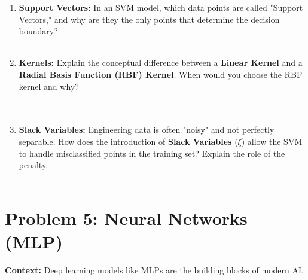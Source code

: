 \documentclass[12pt]{article}
\begin{document}
\begin{enumerate}[label=(\alph*)]
    \item \textbf{Support Vectors:} In an SVM model, which data points are called "Support Vectors," and why are they the only points that determine the decision boundary? \\
    \fullunderline \\
    \fullunderline

    \item \textbf{Kernels:} Explain the conceptual difference between a \textbf{Linear Kernel} and a \textbf{Radial Basis Function (RBF) Kernel}. When would you choose the RBF kernel and why? \\
    \fullunderline \\
    \fullunderline \\
    \fullunderline

    \item \textbf{Slack Variables:} Engineering data is often "noisy" and not perfectly separable. How does the introduction of \textbf{Slack Variables} ($\xi$) allow the SVM to handle misclassified points in the training set? Explain the role of the penalty. \\
    \fullunderline \\
    \fullunderline
\end{enumerate}

\section{Problem 5: Neural Networks (MLP)}
\textbf{Context:} Deep learning models like MLPs are the building blocks of modern AI.
\end{document}
